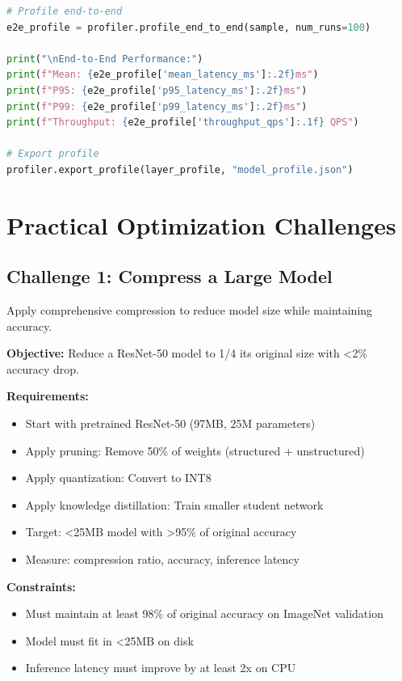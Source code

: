 \begin{lstlisting}[language=Python, caption=Performance Profiling Framework]
# Profile end-to-end
e2e_profile = profiler.profile_end_to_end(sample, num_runs=100)

print("\nEnd-to-End Performance:")
print(f"Mean: {e2e_profile['mean_latency_ms']:.2f}ms")
print(f"P95: {e2e_profile['p95_latency_ms']:.2f}ms")
print(f"P99: {e2e_profile['p99_latency_ms']:.2f}ms")
print(f"Throughput: {e2e_profile['throughput_qps']:.1f} QPS")

# Export profile
profiler.export_profile(layer_profile, "model_profile.json")
\end{lstlisting}

\section{Practical Optimization Challenges}

\subsection{Challenge 1: Compress a Large Model}

Apply comprehensive compression to reduce model size while maintaining accuracy.

\textbf{Objective:} Reduce a ResNet-50 model to 1/4 its original size with <2\% accuracy drop.

\textbf{Requirements:}
\begin{itemize}
    \item Start with pretrained ResNet-50 (97MB, 25M parameters)
    \item Apply pruning: Remove 50\% of weights (structured + unstructured)
    \item Apply quantization: Convert to INT8
    \item Apply knowledge distillation: Train smaller student network
    \item Target: <25MB model with >95\% of original accuracy
    \item Measure: compression ratio, accuracy, inference latency
\end{itemize}

\textbf{Constraints:}
\begin{itemize}
    \item Must maintain at least 98\% of original accuracy on ImageNet validation
    \item Model must fit in <25MB on disk
    \item Inference latency must improve by at least 2x on CPU
\end{itemize}

